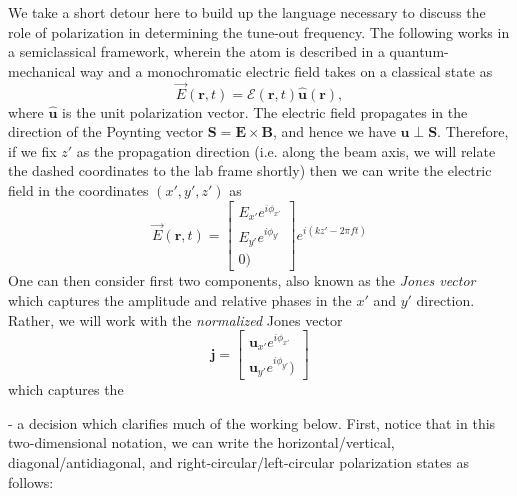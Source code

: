 	We take a short detour here to build up the language necessary to discuss the role of polarization in determining the tune-out frequency.
	The following works in a semiclassical framework, wherein the atom is described in a quantum-mechanical way and a monochromatic electric field takes on a classical state as
	\begin{equation}
		\vec{E}(\mathbf{r},t) = \mathcal{E}(\mathbf{r},t)\hat{\mathbf{u}}(\mathbf{r}),
	\end{equation}
	where $\hat{\mathbf{u}}$ is the unit polarization vector. The electric field propagates in the direction of the Poynting vector $\mathbf{S} = \mathbf{E}\times\mathbf{B}$, and hence we have $\hat{\mathbf{u}}\perp\mathbf{S}$. Therefore, if we fix $z'$ as the propagation direction (i.e. along the beam axis, we will relate the dashed coordinates to the lab frame shortly) then we can write the electric field in the coordinates $(x',y',z')$ as 
	\begin{equation}
		\vec{E}(\mathbf{r},t) = \begin{bmatrix}E_{x'}e^{i\phi_{x'}}\\
												E_{y'}e^{i\phi_{y'}}\\
												0)
												\end{bmatrix}e^{i(kz'-2\pi f t)}
	\end{equation}
	One can then consider first two components, also known as the \emph{Jones vector} which captures the amplitude and relative phases in the $x'$ and $y'$ direction.
	Rather, we will work with the \emph{normalized} Jones vector 
	\begin{equation}
	\mathbf{j} = \begin{bmatrix}\mathbf{u}_{x'}e^{i\phi_{x'}}\\
								\mathbf{u}_{y'}e^{i\phi_{y'}})\end{bmatrix}
	\end{equation}
	which captures the 


	  - a decision which clarifies much of the working below.
	First, notice that in this two-dimensional notation, we can write the horizontal/vertical, diagonal/antidiagonal, and right-circular/left-circular polarization states as follows:
	

